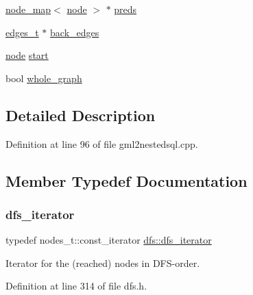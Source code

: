 \begin{DoxyCompactItemize}
\item 
\mbox{\hyperlink{classnode__map}{node\+\_\+map}}$<$ \mbox{\hyperlink{classnode}{node}} $>$ $\ast$ \mbox{\hyperlink{classdfs_a3fdeb5a211a1bc1753b2a637258c5355}{preds}}
\item 
\mbox{\hyperlink{edge_8h_a8f9587479bda6cf612c103494b3858e3}{edges\+\_\+t}} $\ast$ \mbox{\hyperlink{classdfs_a1dc18a7df8d6b238d5301c92fc7540fa}{back\+\_\+edges}}
\item 
\mbox{\hyperlink{classnode}{node}} \mbox{\hyperlink{classdfs_af677cfc31fe06a18dd3a3aae7f7d112b}{start}}
\item 
bool \mbox{\hyperlink{classdfs_ab8342c80ab208ef0e0d781f0769d0d95}{whole\+\_\+graph}}
\end{DoxyCompactItemize}


\subsection{Detailed Description}


Definition at line 96 of file gml2nestedsql.\+cpp.



\subsection{Member Typedef Documentation}
\mbox{\label{classdfs_a15fe023a5a1f7ddda00f3d87110d9a32}} 
\subsubsection{\texorpdfstring{dfs\+\_\+iterator}{dfs\_iterator}}
{\footnotesize\ttfamily typedef nodes\+\_\+t\+::const\+\_\+iterator \mbox{\hyperlink{classdfs_a15fe023a5a1f7ddda00f3d87110d9a32}{dfs\+::dfs\+\_\+iterator}}\hspace{0.3cm}{\ttfamily [inherited]}}



Iterator for the (reached) nodes in D\+F\+S-\/order. 



Definition at line 314 of file dfs.\+h.

\mbox{\label{classdfs_a95e353f354d3b31daded0c4fe749171a}} 
